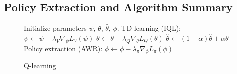 \subsection{Policy Extraction and Algorithm Summary}

\begin{figure}
    \begin{minipage}{0.4\textwidth}
        \begin{algorithm}[H]
            \caption{\Ournamepref Q-learning}
            \begin{algorithmic}
            \label{alg:iql}
                \State Initialize parameters $\psi$, $\theta$, $\hat{\theta}$, $\phi$.
                \State TD learning (IQL):
                \State $\psi \leftarrow \psi - \lambda_V \nabla_\psi L_V(\psi)$ 
                \State $\theta \leftarrow \theta - \lambda_Q \nabla_{\theta} L_Q(\theta)$
                \State $\hat{\theta} \leftarrow (1-\alpha)\hat{\theta} + \alpha\theta$
                \EndFor
                \State Policy extraction (AWR):
                \State $\phi \leftarrow \phi - \lambda_\pi \nabla_\phi L_\pi(\phi)$
                \EndFor
            \end{algorithmic}
        \end{algorithm}
    \end{minipage}
\end{figure}

